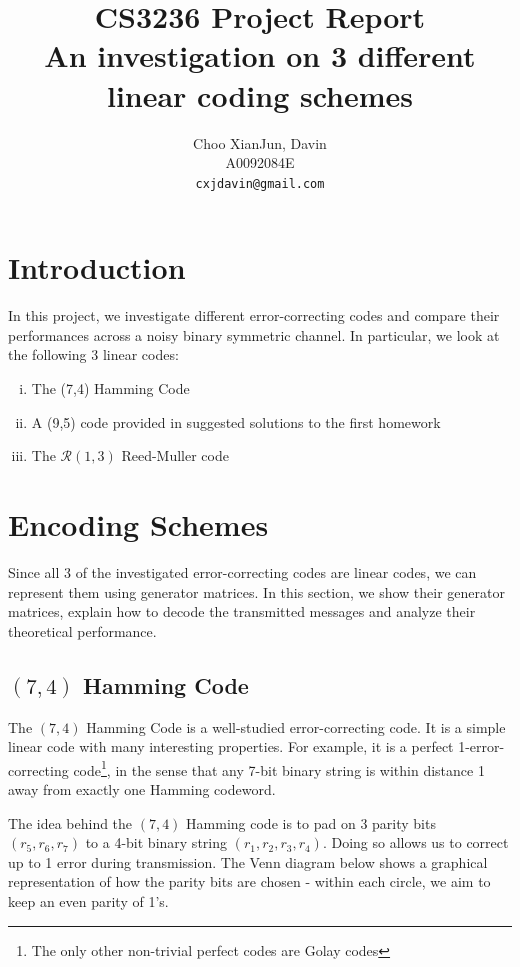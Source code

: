 \documentclass[12pt, a4paper]{article}
\begin{document}
\title{CS3236 Project Report\\ An investigation on 3 different linear coding schemes}
\author{Choo XianJun, Davin \\ A0092084E \\ \texttt{cxjdavin@gmail.com}}
\date{} %
\maketitle

\section{Introduction}
In this project, we investigate different error-correcting codes and compare their performances across a noisy binary symmetric channel. In particular, we look at the following 3 linear codes:
\begin{enumerate}[(i)]
\item The (7,4) Hamming Code
\item A (9,5) code provided in suggested solutions to the first homework
\item The $\mathcal{R}(1,3)$ Reed-Muller code
\end{enumerate}

\section{Encoding Schemes}
Since all 3 of the investigated error-correcting codes are linear codes, we can represent them using generator matrices. In this section, we show their generator matrices, explain how to decode the transmitted messages and analyze their theoretical performance.

\subsection{$(7,4)$ Hamming Code}
The $(7,4)$ Hamming Code is a well-studied error-correcting code. It is a simple linear code with many interesting properties. For example, it is a perfect 1-error-correcting code\footnote{The only other non-trivial perfect codes are Golay codes}, in the sense that any 7-bit binary string is within distance 1 away from exactly one Hamming codeword.

The idea behind the $(7,4)$ Hamming code is to pad on 3 parity bits $(r_5, r_6, r_7)$ to a 4-bit binary string $(r_1, r_2, r_3, r_4)$. Doing so allows us to correct up to 1 error during transmission. The Venn diagram below shows a graphical representation of how the parity bits are chosen - within each circle, we aim to keep an even parity of 1's.
\end{document}
